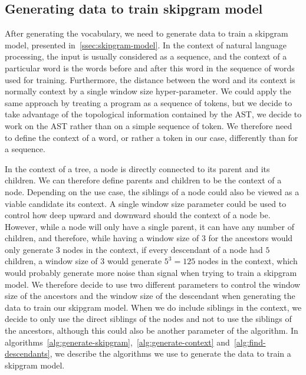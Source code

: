 \subsection{Generating data to train skipgram model}
After generating the vocabulary, we need to generate data to train a skipgram
model, presented in~\ref{ssec:skipgram-model}. In the context of natural
language processing, the input is usually considered as a sequence, and the
context of a particular word is the words before and after this word in the
sequence of words used for training. Furthermore, the distance between the word
and its context is normally context by a single window size hyper-parameter.
We could apply the same approach by treating a program as a sequence of tokens,
but we decide to take advantage of the topological information contained by the
AST, we decide to work on the AST rather than on a simple sequence of token. We
therefore need to define the context of a word, or rather a token in our case,
differently than for a sequence.

In the context of a tree, a node is directly connected to its parent and its
children. We can therefore define parents and children to be the context of a
node. Depending on the use case, the siblings of a node could also be viewed as
a viable candidate its context. A single window size parameter could be used to
control how deep upward and downward should the context of a node be. However,
while a node will only have a single parent, it can have any number of children,
and therefore, while having a window size of $3$ for the ancestors would only
generate $3$ nodes in the context, if every descendant of a node had $5$
children, a window size of $3$ would generate $5^3 = 125$ nodes in the context,
which would probably generate more noise than signal when trying to train a
skipgram model. We therefore decide to use two different parameters to control
the window size of the ancestors and the window size of the descendant when
generating the data to train our skipgram model. When we do include siblings in
the context, we decide to only use the direct siblings of the nodes and not to
use the siblings of the ancestors, although this could also be another parameter
of the algorithm. In
algorithms~\ref{alg:generate-skipgram},~\ref{alg:generate-context}
and~\ref{alg:find-descendants}, we describe the algorithms we use to generate
the data to train a skipgram model.

